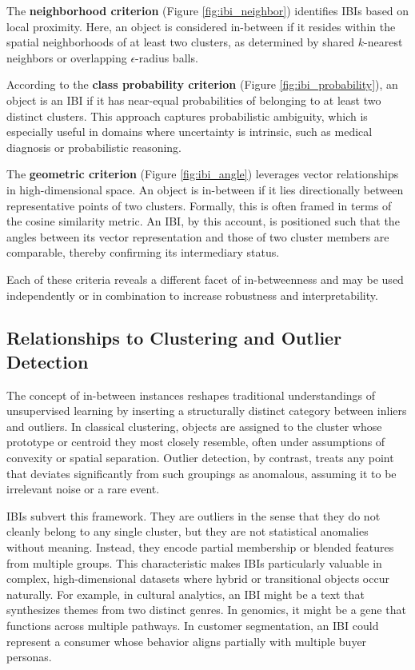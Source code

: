 The \textbf{neighborhood criterion} (Figure \ref{fig:ibi_neighbor}) identifies IBIs based on local proximity. Here, an object is considered in-between if it resides within the spatial neighborhoods of at least two clusters, as determined by shared $k$-nearest neighbors or overlapping $\epsilon$-radius balls.

According to the \textbf{class probability criterion} (Figure \ref{fig:ibi_probability}), an object is an IBI if it has near-equal probabilities of belonging to at least two distinct clusters. This approach captures probabilistic ambiguity, which is especially useful in domains where uncertainty is intrinsic, such as medical diagnosis or probabilistic reasoning.

The \textbf{geometric criterion} (Figure \ref{fig:ibi_angle}) leverages vector relationships in high-dimensional space. An object is in-between if it lies directionally between representative points of two clusters. Formally, this is often framed in terms of the cosine similarity metric. An IBI, by this account, is positioned such that the angles between its vector representation and those of two cluster members are comparable, thereby confirming its intermediary status.

Each of these criteria reveals a different facet of in-betweenness and may be used independently or in combination to increase robustness and interpretability.

\subsection{Relationships to Clustering and Outlier Detection}

The concept of in-between instances reshapes traditional understandings of unsupervised learning by inserting a structurally distinct category between inliers and outliers. In classical clustering, objects are assigned to the cluster whose prototype or centroid they most closely resemble, often under assumptions of convexity or spatial separation. Outlier detection, by contrast, treats any point that deviates significantly from such groupings as anomalous, assuming it to be irrelevant noise or a rare event.

IBIs subvert this framework. They are outliers in the sense that they do not cleanly belong to any single cluster, but they are not statistical anomalies without meaning. Instead, they encode partial membership or blended features from multiple groups. This characteristic makes IBIs particularly valuable in complex, high-dimensional datasets where hybrid or transitional objects occur naturally. For example, in cultural analytics, an IBI might be a text that synthesizes themes from two distinct genres. In genomics, it might be a gene that functions across multiple pathways. In customer segmentation, an IBI could represent a consumer whose behavior aligns partially with multiple buyer personas.

